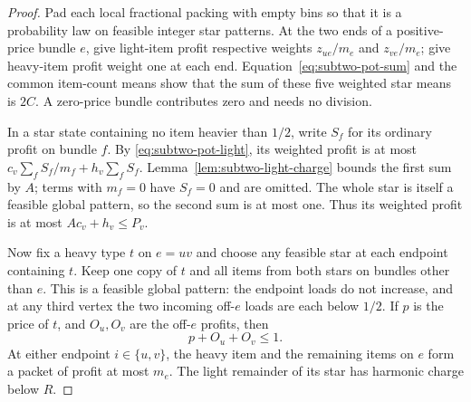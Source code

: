 \documentclass[11pt]{article}
\theoremstyle{definition}\newtheorem{algorithm}{Algorithm}[section]
\numberwithin{equation}{section}
\theoremstyle{remark}\newtheorem*{remark}{Remark}
\begin{document}
\begin{proof}
Pad each local fractional packing with empty bins so that it is a
probability law on feasible integer star patterns. At the two ends
of a positive-price bundle $e$, give light-item profit respective
weights $z_{ue}/m_e$ and $z_{ve}/m_e$; give heavy-item profit weight
one at each end. Equation~\eqref{eq:subtwo-pot-sum} and the common
item-count means show that the sum of these five weighted star means
is $2C$. A zero-price bundle contributes zero and needs no division.

In a star state containing no item heavier than $1/2$, write $S_f$
for its ordinary profit on bundle $f$. By
\eqref{eq:subtwo-pot-light}, its weighted profit is at most
$c_v\sum_fS_f/m_f+h_v\sum_fS_f$. Lemma~\ref{lem:subtwo-light-charge}
bounds the first sum by $A$; terms with $m_f=0$ have $S_f=0$ and are
omitted. The whole star is itself a feasible
global pattern, so the second sum is at most one. Thus its weighted
profit is at most $Ac_v+h_v\le P_v$.

Now fix a heavy type $t$ on $e=uv$ and choose any feasible star at
each endpoint containing $t$. Keep one copy of $t$ and all items
from both stars on bundles other than $e$. This is a feasible global
pattern: the endpoint loads do not increase, and at any third vertex
the two incoming off-$e$ loads are each below $1/2$. If $p$ is the
price of $t$, and $O_u,O_v$ are the off-$e$ profits, then
\begin{equation}\label{eq:subtwo-pot-pair}
                         p+O_u+O_v\le1.
\end{equation}
At either endpoint $i\in\{u,v\}$, the heavy item and the remaining
items on $e$ form a packet of profit at most $m_e$. The light
remainder of its star has harmonic charge below $R$.


\end{proof}
\end{document}
